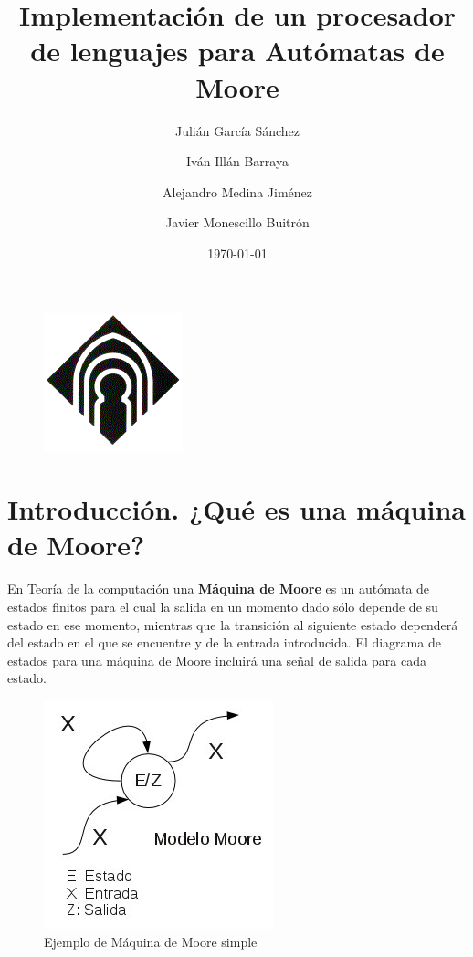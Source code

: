 \documentclass[12pt,a4paper]{article}
\author{Julián García Sánchez \and Iván Illán Barraya \and Alejandro Medina Jiménez \and Javier Monescillo Buitrón}
\title{Implementación de un procesador de lenguajes para Autómatas de Moore}
\date{\today}
\begin{document}
	
	\maketitle
	
	\begin{figure}[h]
		\centering
		\includegraphics[width=0.25
		\linewidth]{img/image004}
		\caption{}
		\label{fig:image004}
	\end{figure}

	\newpage
	\tableofcontents
	\newpage
	
	\section{Introducción. ¿Qué es una máquina de Moore?}
	
En Teoría de la computación una \textbf{Máquina de Moore} es un autómata de estados finitos para el cual la salida en un momento dado sólo depende de su estado en ese momento, mientras que la transición al siguiente estado dependerá del estado en el que se encuentre y de la entrada introducida.
	\newline
	El diagrama de estados para una máquina de Moore incluirá una señal de salida para cada estado. \cite{Moore1}
	
	\begin{figure}[h]
		\centering
		\includegraphics[width=0.5
		\linewidth]{img/Modelo-moore}
		\caption{Ejemplo de Máquina de Moore simple}
		\label{fig:modelo-moore}
	\end{figure}
	
\end{document}
